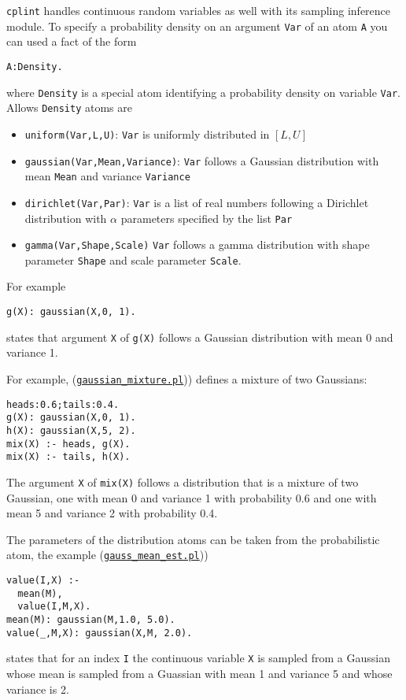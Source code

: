 \verb|cplint| handles continuous random variables as well with its
sampling inference module.
To specify a probability density on an argument \verb|Var| of an atom
\verb|A| you can used a fact of the form
\begin{verbatim}
A:Density.
\end{verbatim}
where \verb|Density| is a special atom identifying a probability  density on variable \verb|Var|.
Allows \verb|Density| atoms are
\begin{itemize}
\item \verb|uniform(Var,L,U)|: \verb|Var| is uniformly distributed in $[L,U]$
\item \verb|gaussian(Var,Mean,Variance)|: \verb|Var| follows a Gaussian distribution with mean \verb|Mean| and variance \verb|Variance|
\item \verb|dirichlet(Var,Par)|: \verb|Var| is a list of real
numbers following a Dirichlet distribution with $\alpha$ parameters specified
by the list \verb|Par|
\item \verb|gamma(Var,Shape,Scale)|  \verb|Var| follows a gamma distribution 
with shape parameter \verb|Shape| and scale parameter \verb|Scale|.
\end{itemize}
For example
\begin{verbatim}
g(X): gaussian(X,0, 1).
\end{verbatim}
states that argument \verb|X| of \verb|g(X)| follows a Gaussian 
distribution with mean 0 and variance 1.

For example, (\href{http://cplint.lamping.unife.it/example/inference/gaussian_mixture.pl}{\texttt{gaussian\_mixture.pl}})) defines a mixture of two Gaussians:
\begin{verbatim}
heads:0.6;tails:0.4.
g(X): gaussian(X,0, 1).
h(X): gaussian(X,5, 2).
mix(X) :- heads, g(X).
mix(X) :- tails, h(X).
\end{verbatim}
The argument \verb|X| of
\verb|mix(X)| follows a distribution that is a mixture of two Gaussian,
one with mean 0 and variance 1 with probability 0.6 and one with 
mean 5 and variance 2 with probability 0.4.

The parameters of the distribution atoms can be taken from the probabilistic
atom, the example (\href{http://cplint.lamping.unife.it/example/inference/gauss_mean_est.pl}{\texttt{gauss\_mean\_est.pl}}))
\begin{verbatim}
value(I,X) :-
  mean(M),
  value(I,M,X).
mean(M): gaussian(M,1.0, 5.0).
value(_,M,X): gaussian(X,M, 2.0).
\end{verbatim}
states that for an index \verb|I| the continuous variable \verb|X| is 
sampled from a Gaussian whose mean is sampled from a Guassian with mean 1 and
variance 5 and whose variance is 2.


